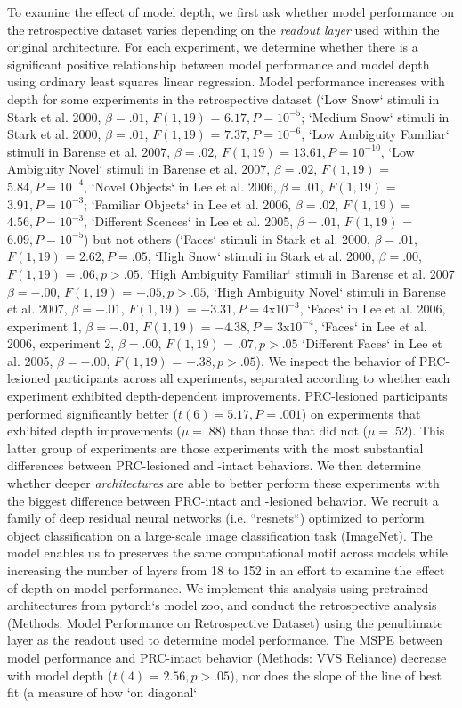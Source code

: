 \documentclass[11pt]{article}
\begin{document}
To examine the effect of model depth, we first ask whether model performance on the retrospective dataset varies depending on the \emph{readout layer} used within the original architecture. For each experiment, we determine whether there is a significant positive relationship between model performance and model depth using ordinary least squares linear regression. Model performance increases with depth for some experiments in the retrospective dataset (`Low Snow` stimuli in Stark et al. 2000, $\beta = .01$, $F(1, 19)$ = $6.17, P = 10 ^{-5} $; `Medium Snow` stimuli in Stark et al. 2000, $\beta = .01$, $F(1, 19)$ = $7.37, P = 10 ^{-6} $, `Low Ambiguity Familiar` stimuli in Barense et al. 2007, $\beta = .02$, $F(1, 19)$ = $13.61, P = 10 ^{-10} $, `Low Ambiguity Novel` stimuli in Barense et al. 2007, $\beta = .02$, $F(1, 19)$ = $5.84, P = 10 ^{-4} $, `Novel Objects` in Lee et al. 2006, $\beta = .01$, $F(1, 19)$ = $3.91, P = 10 ^{-3} $; `Familiar Objects` in Lee et al. 2006, $\beta = .02$, $F(1, 19)$ = $4.56, P = 10 ^{-3} $, `Different Scences` in Lee et al. 2005, $\beta = .01$, $F(1, 19)$ = $6.09, P = 10 ^{-5} $) but not others (`Faces` stimuli in Stark et al. 2000, $\beta = .01$, $F(1, 19)$ = $2.62, P = .05 $, `High Snow` stimuli in Stark et al. 2000, $\beta = .00$, $F(1, 19)$ = $.06, p > .05$, `High Ambiguity Familiar` stimuli in Barense et al. 2007  $\beta = -.00$, $F(1, 19)$ = $-.05, p > .05$, `High Ambiguity Novel` stimuli in Barense et al. 2007, $\beta = -.01$, $F(1, 19)$ = $-3.31, P = 4 $x$ 10 ^{-3} $, `Faces` in Lee et al. 2006, experiment 1, $\beta = -.01$, $F(1, 19)$ = $-4.38, P = 3 $x$ 10 ^{-4} $, `Faces` in Lee et al. 2006, experiment 2, $\beta = .00$, $F(1, 19)$ = $.07, p > .05$ `Different Faces` in Lee et al. 2005, $\beta = -.00$, $F(1, 19)$ = $-.38, p > .05$). We inspect the behavior of PRC-lesioned participants across all experiments, separated according to whether each experiment exhibited depth-dependent improvements. PRC-lesioned participants performed significantly better ($t(6) = 5.17, P = .001$) on experiments that exhibited depth improvements ($\mu=.88$) than those that did not ($\mu=.52$). This latter group of experiments are those experiments with the most substantial differences between PRC-lesioned and -intact behaviors. We then determine whether deeper \emph{architectures} are able to better perform these experiments with the biggest difference between PRC-intact and -lesioned behavior. We recruit a family of deep residual neural networks\cite{he2016deep} (i.e. ``resnets``) optimized to perform object classification on a large-scale image classification task (ImageNet\cite{deng2009imagenet}). The model enables us to preserves the same computational motif across models while increasing the number of layers from 18 to 152 in an effort to examine the effect of depth on model performance. We implement this analysis using pretrained architectures from pytorch`s model zoo, and conduct the retrospective analysis (Methods: Model Performance on Retrospective Dataset) using the penultimate layer as the readout used to determine model performance. The MSPE between model performance and PRC-intact behavior (Methods: VVS Reliance) decrease with model depth ($t(4)$ = $2.56, p > .05$), nor does the slope of the line of best fit (a measure of how `on diagonal` 
\end{document}
